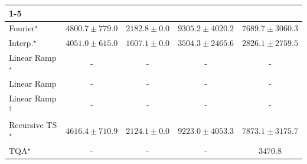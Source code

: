 \begin{tabular}{l|cccc|}
\cline{1-5}
\multicolumn{5}{c}{\rule{0pt}{8pt}SV} \\
\midrule
Fourier$^\star$ & {\cellcolor[HTML]{96B6D7}} \color[HTML]{000000} $4800.7\pm 779.0$ & {\cellcolor[HTML]{F4EDF6}} \color[HTML]{000000} $2182.8\pm 0.0$ & {\cellcolor[HTML]{023858}} \color[HTML]{F1F1F1} $9305.2\pm 4020.2$ & {\cellcolor[HTML]{0569A4}} \color[HTML]{F1F1F1} $7689.7\pm 3060.3$ \\
Interp.$^\star$ & {\cellcolor[HTML]{B9C6E0}} \color[HTML]{000000} $4051.0\pm 615.0$ & {\cellcolor[HTML]{FFF7FB}} \color[HTML]{000000} $1607.1\pm 0.0$ & {\cellcolor[HTML]{D1D2E6}} \color[HTML]{000000} $3504.3\pm 2465.6$ & {\cellcolor[HTML]{E5E1EF}} \color[HTML]{000000} $2826.1\pm 2759.5$ \\
Linear Ramp$^\star$ & {\cellcolor[HTML]{000000}} \color[HTML]{F1F1F1} {\cellcolor{white}} \color{black} - & {\cellcolor[HTML]{000000}} \color[HTML]{F1F1F1} {\cellcolor{white}} \color{black} - & {\cellcolor[HTML]{000000}} \color[HTML]{F1F1F1} {\cellcolor{white}} \color{black} - & {\cellcolor[HTML]{000000}} \color[HTML]{F1F1F1} {\cellcolor{white}} \color{black} - \\
Linear Ramp & {\cellcolor[HTML]{000000}} \color[HTML]{F1F1F1} {\cellcolor{white}} \color{black} - & {\cellcolor[HTML]{000000}} \color[HTML]{F1F1F1} {\cellcolor{white}} \color{black} - & {\cellcolor[HTML]{000000}} \color[HTML]{F1F1F1} {\cellcolor{white}} \color{black} - & {\cellcolor[HTML]{000000}} \color[HTML]{F1F1F1} {\cellcolor{white}} \color{black} - \\
Linear Ramp$^\dagger$ & {\cellcolor[HTML]{000000}} \color[HTML]{F1F1F1} {\cellcolor{white}} \color{black} - & {\cellcolor[HTML]{000000}} \color[HTML]{F1F1F1} {\cellcolor{white}} \color{black} - & {\cellcolor[HTML]{000000}} \color[HTML]{F1F1F1} {\cellcolor{white}} \color{black} - & {\cellcolor[HTML]{000000}} \color[HTML]{F1F1F1} {\cellcolor{white}} \color{black} - \\
Recursive TS$^\star$ & {\cellcolor[HTML]{9FBAD9}} \color[HTML]{000000} $4616.4\pm 710.9$ & {\cellcolor[HTML]{F5EEF6}} \color[HTML]{000000} $2124.1\pm 0.0$ & {\cellcolor[HTML]{023A5B}} \color[HTML]{F1F1F1} $9223.0\pm 4053.3$ & {\cellcolor[HTML]{04649E}} \color[HTML]{F1F1F1} $7873.1\pm 3175.7$ \\
TQA$^\star$ & {\cellcolor[HTML]{000000}} \color[HTML]{F1F1F1} {\cellcolor{white}} \color{black} - & {\cellcolor[HTML]{000000}} \color[HTML]{F1F1F1} {\cellcolor{white}} \color{black} - & {\cellcolor[HTML]{000000}} \color[HTML]{F1F1F1} {\cellcolor{white}} \color{black} - & {\cellcolor[HTML]{D2D3E7}} \color[HTML]{000000} $3470.8$ \\

\end{tabular}
